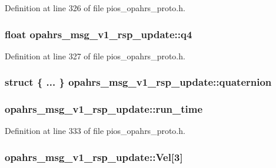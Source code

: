 Definition at line 326 of file pios\-\_\-opahrs\-\_\-proto.\-h.

\hypertarget{structopahrs__msg__v1__rsp__update_af1a9866d8742306019515de9303f2cd6}{
\subsubsection[{q4}]{\setlength{\rightskip}{0pt plus 5cm}float opahrs\-\_\-msg\-\_\-v1\-\_\-rsp\-\_\-update\-::q4}}\label{structopahrs__msg__v1__rsp__update_af1a9866d8742306019515de9303f2cd6}


Definition at line 327 of file pios\-\_\-opahrs\-\_\-proto.\-h.

\hypertarget{structopahrs__msg__v1__rsp__update_ad2180b2f87c7e994cbe4636785ca50b5}{
\subsubsection[{quaternion}]{\setlength{\rightskip}{0pt plus 5cm}struct \{ ... \}   opahrs\-\_\-msg\-\_\-v1\-\_\-rsp\-\_\-update\-::quaternion}}\label{structopahrs__msg__v1__rsp__update_ad2180b2f87c7e994cbe4636785ca50b5}
\hypertarget{structopahrs__msg__v1__rsp__update_a393c0a5c96853f390a4060f660841d13}{
\subsubsection[{run\-\_\-time}]{ opahrs\-\_\-msg\-\_\-v1\-\_\-rsp\-\_\-update\-::run\-\_\-time}}\label{structopahrs__msg__v1__rsp__update_a393c0a5c96853f390a4060f660841d13}


Definition at line 333 of file pios\-\_\-opahrs\-\_\-proto.\-h.

\hypertarget{structopahrs__msg__v1__rsp__update_a5f8cf56968eeb052030a3e9aaf3e1c52}{
\subsubsection[{Vel}]{ opahrs\-\_\-msg\-\_\-v1\-\_\-rsp\-\_\-update\-::\-Vel\mbox{[}3\mbox{]}}}\label{structopahrs__msg__v1__rsp__update_a5f8cf56968eeb052030a3e9aaf3e1c52}


